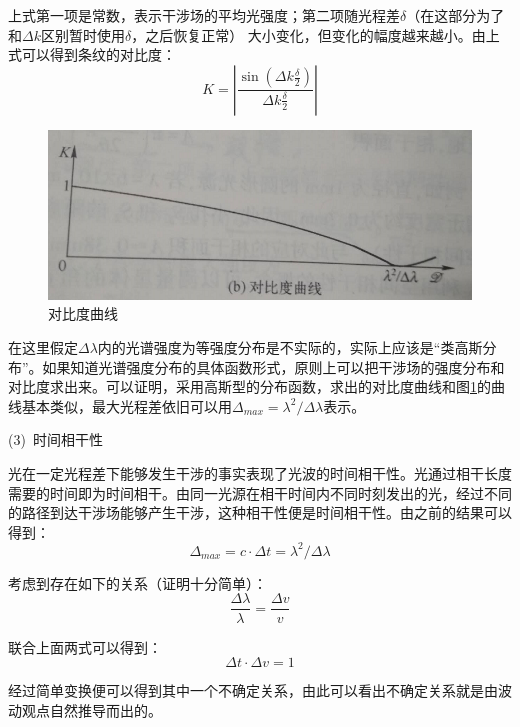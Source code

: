 \documentclass[UTF8]{ctexart}
\begin{document}
\noindent 上式第一项是常数，表示干涉场的平均光强度；第二项随光程差$\delta$（在这部分为了和$ \Delta k $区别暂时使用$ \delta $，之后恢复正常） 大小变化，但变化的幅度越来越小。由上式可以得到条纹的对比度：
\begin{equation}
	K=\left|\frac{\sin \left(\Delta k \frac{\delta}{2}\right)}{\Delta k \frac{\delta}{2}}\right|
\end{equation}

	\begin{figure}[ht]
		\centering
		\includegraphics[width=12cm]{compare_lights.png}
		\caption{对比度曲线}
		\label{figure_compare_lights}
	\end{figure}

	在这里假定$ \Delta \lambda$内的光谱强度为等强度分布是不实际的，实际上应该是“类高斯分布”。如果知道光谱强度分布的具体函数形式，原则上可以把干涉场的强度分布和对比度求出来。可以证明，采用高斯型的分布函数，求出的对比度曲线和图\ref{figure_compare_lights}的曲线基本类似，最大光程差依旧可以用$ \Delta_{max}=\lambda^{2}/\Delta \lambda $表示。
	
	(3)\ 时间相干性
	
	光在一定光程差下能够发生干涉的事实表现了光波的时间相干性。光通过相干长度需要的时间即为时间相干。由同一光源在相干时间内不同时刻发出的光，经过不同的路径到达干涉场能够产生干涉，这种相干性便是时间相干性。由之前的结果可以得到：
	\begin{equation}
		\Delta_{max}= c \cdot \Delta t =\lambda^{2}/\Delta \lambda
	\end{equation}
	
\noindent 考虑到存在如下的关系（证明十分简单）：
	\begin{equation}
		\frac{\Delta \lambda}{\lambda}=\frac{\Delta v}{v}
	\end{equation}

\noindent 联合上面两式可以得到：
	\begin{equation}
		\Delta t \cdot \Delta v=1
	\end{equation}
	
\noindent 经过简单变换便可以得到其中一个不确定关系，由此可以看出不确定关系就是由波动观点自然推导而出的。
\end{document}
